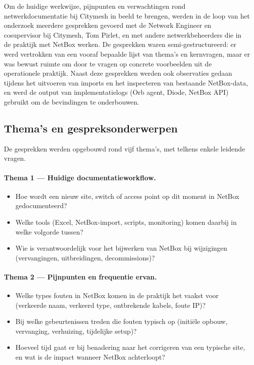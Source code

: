 Om de huidige werkwijze, pijnpunten en verwachtingen rond netwerkdocumentatie bij Citymesh in beeld te brengen, werden in de loop van het onderzoek meerdere gesprekken gevoerd met de Network Engineer en cosupervisor bij Citymesh, Tom Pirlet, en met andere netwerkbeheerders die in de praktijk met NetBox werken. De gesprekken waren semi-gestructureerd: er werd vertrokken van een vooraf bepaalde lijst van thema's en kernvragen, maar er was bewust ruimte om door te vragen op concrete voorbeelden uit de operationele praktijk. Naast deze gesprekken werden ook observaties gedaan tijdens het uitvoeren van imports en het inspecteren van bestaande NetBox-data, en werd de output van implementatielogs (Orb agent, Diode, NetBox API) gebruikt om de bevindingen te onderbouwen.

\subsection{Thema's en gespreksonderwerpen}

De gesprekken werden opgebouwd rond vijf thema's, met telkens enkele leidende vragen.

\paragraph{Thema 1 --- Huidige documentatieworkflow.}
\begin{itemize}
  \item Hoe wordt een nieuw site, switch of access point op dit moment in NetBox gedocumenteerd?
  \item Welke tools (Excel, NetBox-import, scripts, monitoring) komen daarbij in welke volgorde tussen?
  \item Wie is verantwoordelijk voor het bijwerken van NetBox bij wijzigingen (vervangingen, uitbreidingen, decommissions)?
\end{itemize}

\paragraph{Thema 2 --- Pijnpunten en frequentie ervan.}
\begin{itemize}
  \item Welke types fouten in NetBox komen in de praktijk het vaakst voor (verkeerde naam, verkeerd type, ontbrekende kabels, foute IP)?
  \item Bij welke gebeurtenissen treden die fouten typisch op (initiële opbouw, vervanging, verhuizing, tijdelijke setup)?
  \item Hoeveel tijd gaat er bij benadering naar het corrigeren van een typische site, en wat is de impact wanneer NetBox achterloopt?
\end{itemize}

